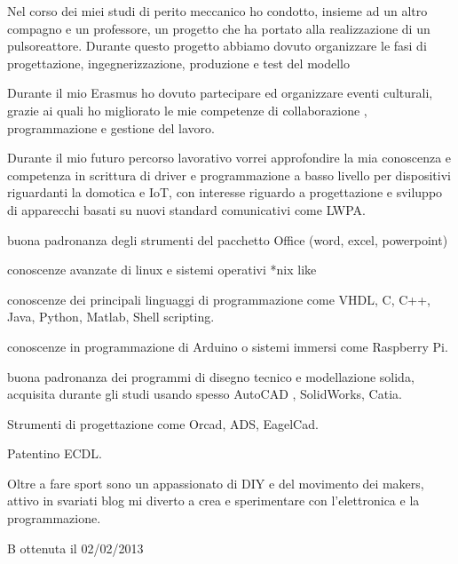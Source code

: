 \documentclass[italian,a4paper]{europasscv}
\begin{document}
\begin{europasscv}
		 {
		\begin{ecvitemize}
			\item Nel corso dei miei studi di perito meccanico ho condotto,
				insieme ad un altro compagno e un professore, un progetto che
				ha portato alla realizzazione di un pulsoreattore. Durante
				questo progetto abbiamo dovuto organizzare le fasi di
				progettazione, ingegnerizzazione, produzione e test del modello
			\item Durante il mio Erasmus ho dovuto partecipare ed organizzare
				eventi culturali, grazie ai quali ho migliorato le mie
				competenze di collaborazione , programmazione e gestione del
				lavoro.
		\end{ecvitemize}
		}

		 {
		\begin{ecvitemize}
			\item Durante il mio futuro percorso lavorativo vorrei approfondire
				la mia conoscenza e competenza in scrittura di driver e
				programmazione a basso livello per dispositivi riguardanti la
				domotica e IoT, con interesse riguardo a progettazione e
				sviluppo di apparecchi basati su nuovi standard comunicativi
				come LWPA.
		\end{ecvitemize}
		}

		 {
			\begin{ecvitemize}
				\item buona padronanza degli strumenti del pacchetto Office
					(word, excel, powerpoint)
				\item conoscenze avanzate di linux e sistemi operativi *nix like
				\item conoscenze dei principali linguaggi di programmazione
					come VHDL, C, C++, Java, Python, Matlab, Shell scripting.
				\item conoscenze in programmazione di Arduino o sistemi immersi
					come Raspberry Pi.
				\item buona padronanza dei programmi di disegno tecnico e
					modellazione solida, acquisita durante gli studi usando
					spesso AutoCAD , SolidWorks, Catia.
				\item Strumenti di progettazione come Orcad, ADS, EagelCad.
				\item Patentino ECDL.
			\end{ecvitemize}
		}

		 {
			Oltre a fare sport sono un appassionato di DIY e del movimento dei
			makers, attivo in svariati blog mi diverto a crea e sperimentare con
			l'elettronica e la programmazione.
		}

		 {
			B ottenuta il 02/02/2013
		}
	\end{europasscv}
\end{document}
